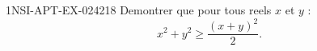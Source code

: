 \begin{exercice}{1NSI-APT-EX-024}{2}{18}
Demontrer que pour tous reels $x$ et $y$ :
\[ x^2 + y^2 \geq \frac{(x+y)^2}{2}. \]

\end{exercice}
